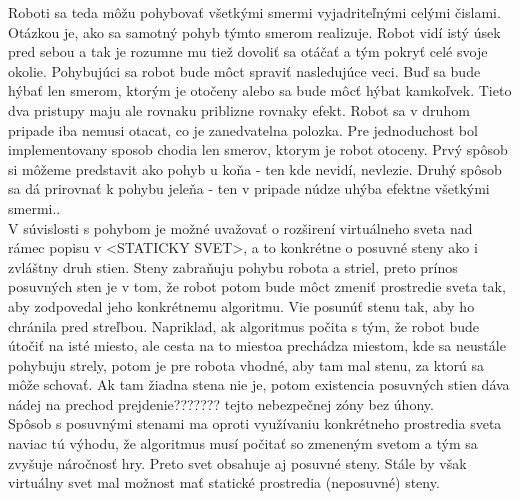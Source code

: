 Roboti sa teda môžu pohybovať  všetkými smermi vyjadriteľnými celými čislami. Otázkou je, ako sa samotný pohyb týmto smerom realizuje. Robot vidí istý úsek pred sebou a tak je rozumne mu tiež dovoliť sa otáčať a tým pokryť celé svoje okolie. Pohybujúci sa robot bude môct spraviť nasledujúce veci. Buď sa bude hýbať len smerom, ktorým je otočeny alebo sa bude môcť hýbat kamkoľvek. Tieto dva pristupy maju ale rovnaku priblizne rovnaky efekt. Robot sa v druhom pripade iba nemusi otacat, co je zanedvatelna polozka. Pre jednoduchost bol implementovany sposob chodia len smerov, ktorym je robot otoceny. %
Prvý spôsob si môžeme predstavit ako pohyb u koňa -  ten kde nevidí, nevlezie. Druhý spôsob sa dá prirovnať k pohybu jeleňa - ten v pripade núdze uhýba efektne všetkými smermi..\\
V súvislosti s pohybom je možné uvažovať o rozširení virtuálneho sveta nad rámec popisu v <STATICKY SVET>, a to konkrétne o posuvné steny ako i zvláštny druh stien. Steny zabraňuju pohybu robota a striel, preto prínos posuvných sten je v tom, že robot potom bude môct zmeniť prostredie sveta tak, aby zodpovedal jeho konkrétnemu algoritmu. Vie posunúť stenu tak, aby ho chránila pred streľbou. Napriklad, ak algoritmus počita s tým, že robot bude útočiť na isté miesto, ale cesta na to miestoa prechádza miestom, kde sa neustále pohybuju strely, potom je pre robota vhodné, aby tam mal stenu, za ktorú sa môže schovať. Ak tam žiadna stena nie je, potom existencia posuvných stien dáva nádej na prechod  prejdenie??????? tejto nebezpečnej zóny bez úhony.\\ 
Spôsob s posuvnými stenami ma oproti využívaniu konkrétneho prostredia sveta naviac tú výhodu, že algoritmus musí počitať so zmeneným svetom a tým sa zvyšuje náročnosť hry. Preto svet obsahuje aj posuvné steny. Stále by však virtuálny svet mal možnost mať statické prostredia (neposuvné) steny. %
